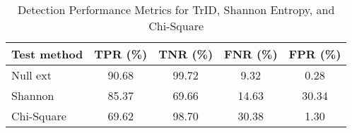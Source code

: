 
    \begin{table}[htbp]
    \centering
    \caption{Detection Performance Metrics for TrID, Shannon Entropy, and Chi-Square}
    \begin{tabular}{|l|c|c|c|c|}
    \toprule
    \textbf{Test method} & \textbf{TPR (\%)} & \textbf{TNR (\%)} & \textbf{FNR (\%)} & \textbf{FPR (\%)} \\
    \midrule
    Null ext   & 90.68 & 99.72 & 9.32 & 0.28 \\
    Shannon    & 85.37 & 69.66 & 14.63 & 30.34 \\
    Chi-Square & 69.62 & 98.70 & 30.38 & 1.30 \\
    \bottomrule
    \end{tabular}
    \end{table}
    
